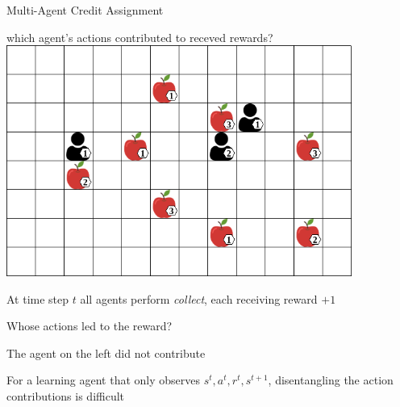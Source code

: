 \begin{frame}{Multi-Agent Credit Assignment}

 which agent's actions contributed to receved rewards? \\[15pt]

\bcol
            \centering
            \includegraphics[width=0.85\textwidth]{images/environments/lbf/foraging_8x12_b.png}

        \blist
            \item At time step $t$ all agents perform \textit{collect}, each receiving reward $+1$
            \item Whose actions led to the reward?
            \item The agent on the left did not contribute
            \item For a learning agent that only observes $s^t, a^t, r^t, s^{t+1}$, disentangling the action contributions is difficult
        \elist

\ecol
    
\end{frame}


